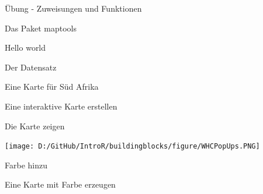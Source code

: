\documentclass[ignorenonframetext,]{beamer}
\newenvironment{Shaded}{\begin{snugshade}}{\end{snugshade}}
\newcommand{\CommentTok}[1]{\textcolor[rgb]{0.00,0.40,1.00}{\textbf{\textit{#1}}}}
\newcommand{\DataTypeTok}[1]{\textcolor[rgb]{0.74,0.68,0.62}{\underline{#1}}}
\newcommand{\KeywordTok}[1]{\textcolor[rgb]{0.26,0.66,0.93}{\textbf{#1}}}
\newcommand{\NormalTok}[1]{\textcolor[rgb]{0.74,0.68,0.62}{#1}}
\newcommand{\OperatorTok}[1]{\textcolor[rgb]{0.74,0.68,0.62}{#1}}
\newcommand{\StringTok}[1]{\textcolor[rgb]{0.02,0.61,0.04}{#1}}
\begin{document}
\begin{frame}[fragile]{Übung - Zuweisungen und Funktionen}
\begin{frame}[fragile]{Das Paket maptools}
\begin{frame}[fragile]{Hello world}
\begin{frame}[fragile]{Der Datensatz}
\begin{frame}[fragile]{Eine Karte für Süd Afrika}
\begin{frame}[fragile]{Eine interaktive Karte erstellen}
\begin{Shaded}
\end{Shaded}

\end{frame}

\begin{frame}{Die Karte zeigen}
\protect\hypertarget{die-karte-zeigen}{}

\texttt{[image: D:/GitHub/IntroR/buildingblocks/figure/WHCPopUps.PNG]}

\end{frame}

\begin{frame}[fragile]{Farbe hinzu}
\protect\hypertarget{farbe-hinzu}{}

\begin{Shaded}
\end{Shaded}

\end{frame}

\begin{frame}[fragile]{Eine Karte mit Farbe erzeugen}
\protect\hypertarget{eine-karte-mit-farbe-erzeugen}{}


\end{frame}
\end{frame}
\end{frame}
\end{frame}
\end{frame}
\end{frame}
\end{document}
